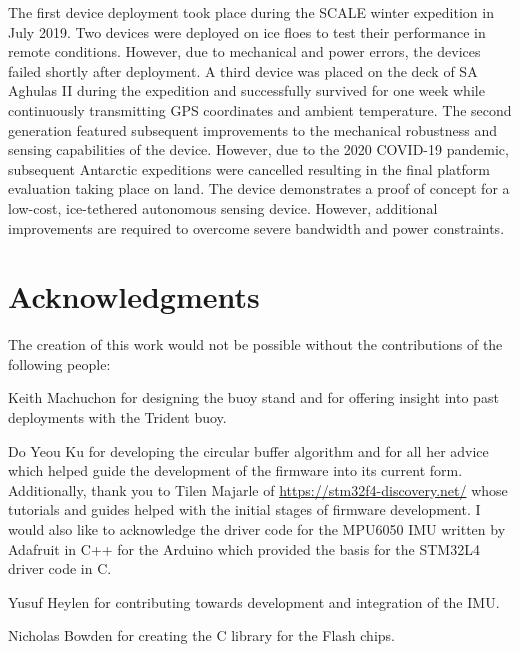 \documentclass[a4paper, 12pt, oneside, openright, parskip=full]{book}
\begin{document}
The first device deployment took place during the SCALE winter expedition in July 2019. Two devices were deployed on ice floes to test their performance in remote conditions. However, due to mechanical and power errors, the devices failed shortly after deployment. A third device was placed on the deck of SA Aghulas II during the expedition and successfully survived for one week while continuously transmitting GPS coordinates and ambient temperature. The second generation featured subsequent improvements to the mechanical robustness and sensing capabilities of the device. However, due to the 2020 COVID-19 pandemic, subsequent Antarctic expeditions were cancelled resulting in the final platform evaluation taking place on land. The device demonstrates a proof of concept for a low-cost, ice-tethered autonomous sensing device. However, additional improvements are required to overcome severe bandwidth and power constraints.
\chapter{Acknowledgments}		
\label{ch:ack}


The creation of this work would not be possible without the contributions of the following people:

Keith Machuchon for designing the buoy stand and for offering insight into past deployments with the Trident buoy.

Do Yeou Ku for developing the circular buffer algorithm and for all her advice which helped guide the development of the firmware into its current form.  Additionally, thank you to Tilen Majarle of \url{https://stm32f4-discovery.net/} whose tutorials and guides helped with the initial stages of firmware development. I would also like to acknowledge the driver code for the MPU6050 IMU written by Adafruit in C++ for the Arduino which provided the basis for the STM32L4 driver code in C.
 
Yusuf Heylen for contributing towards development and integration of the IMU.

Nicholas Bowden for creating the C library for the Flash chips.
\end{document}
